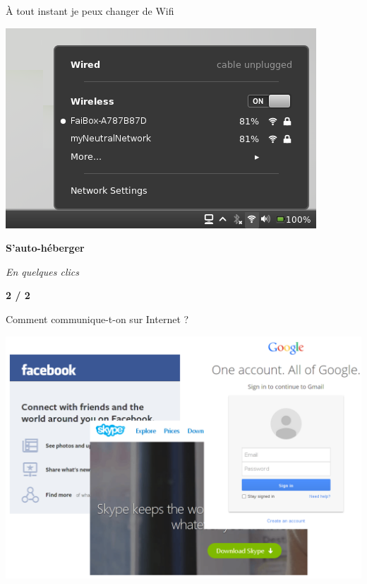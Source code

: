 \documentclass[notes=hide]{beamer}
\begin{document}
\begin{frame}[t]{À tout instant je peux changer de Wifi}
\begin{center}
\vfill
\includegraphics[width=.8\textwidth]{img/14-capture-wifibox2.png}
\vfill
\end{center}
\end{frame}

\begin{frame}[t]{}
\begin{center}
\vfill
{\Huge \textbf{S'auto-héberger}}
\vspace{.5cm}

{\large \emph{En quelques clics}}
\vspace{1cm}

\textbf{2 / 2}
\vfill
\end{center}
\end{frame}

\begin{frame}[t]{Comment communique-t-on sur Internet ?}
\begin{center}
\vfill
\includegraphics[width=.7\textwidth]{img/15a-capture-gmailfbskype.png}
\vfill
\end{center}
\end{frame}
\end{document}
